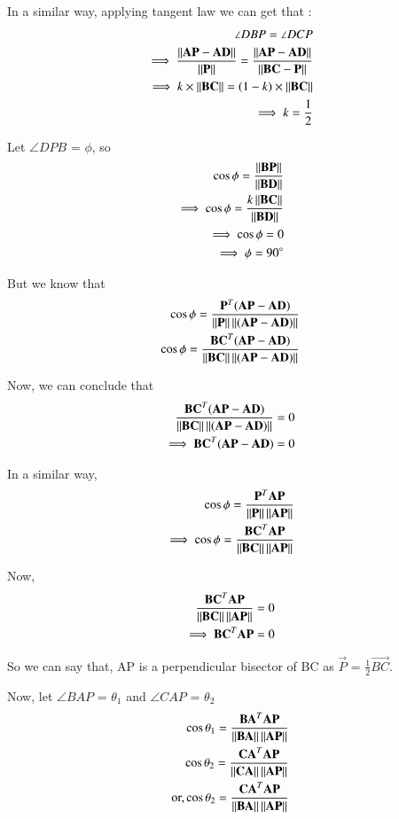 \documentclass[journal,12pt,twocolumn]{IEEEtran}
\begin{document}
In a similar way, applying tangent law we can get that :
\begin{align}
\angle DBP = \angle DCP\\
\implies \frac{\left\lVert\mathbf{AP}-\mathbf{AD}\right\rVert}{\left\lVert\mathbf{P}\right\rVert} = \frac{\left\lVert\mathbf{AP}-\mathbf{AD}\right\rVert}{\left\lVert\mathbf{BC}-\mathbf{P}\right\rVert}\\
\implies k \times \left\lVert\mathbf{BC}\right\rVert = (1-k) \times \left\lVert\mathbf{BC}\right\rVert\\
\implies k= \frac{1}{2}
\end{align}

Let $\angle DPB$ = $\phi$, so
\begin{align}
\cos\phi = \frac{\left\lVert\mathbf{BP}\right\rVert}{\left\lVert\mathbf{BD}\right\rVert}\\
\implies \cos\phi = \frac{k \left\lVert\mathbf{BC}\right\rVert}{\left\lVert\mathbf{BD}\right\rVert}\\
\implies \cos\phi = 0\\
\implies \phi = 90 \degree
\end{align}

But we know that 
\begin{align}
\cos\phi = \frac{\mathbf{P}^T (\mathbf{AP} - \mathbf{AD})}{\left\lVert\mathbf{P}\right\rVert\left\lVert(\mathbf{AP} - \mathbf{AD})\right\rVert}\\
\cos\phi = \frac{\mathbf{BC}^T (\mathbf{AP} - \mathbf{AD})}{\left\lVert\mathbf{BC}\right\rVert\left\lVert(\mathbf{AP} - \mathbf{AD})\right\rVert}
\end{align}

Now, we can conclude that 
\begin{align}
\frac{\mathbf{BC}^T (\mathbf{AP} - \mathbf{AD})}{\left\lVert\mathbf{BC}\right\rVert\left\lVert(\mathbf{AP} - \mathbf{AD})\right\rVert} = 0\\
\implies \mathbf{BC}^T (\mathbf{AP} - \mathbf{AD}) = 0
\end{align}

In a similar way,
\begin{align}
\cos\phi = \frac{\mathbf{P}^T \mathbf{AP}}{\left\lVert\mathbf{P}\right\rVert\left\lVert\mathbf{AP}\right\rVert}\\
\implies \cos\phi = \frac{\mathbf{BC}^T \mathbf{AP}}{\left\lVert\mathbf{BC}\right\rVert\left\lVert\mathbf{AP}\right\rVert}\\
\end{align}

Now, 
\begin{align}
\frac{\mathbf{BC}^T \mathbf{AP}}{\left\lVert\mathbf{BC}\right\rVert\left\lVert\mathbf{AP}\right\rVert} = 0\\
\implies \mathbf{BC}^T \mathbf{AP} = 0
\end{align}

So we can say that, AP is a perpendicular bisector of BC as $\vec{P}$ = $\frac{1}{2} \vec{BC}$.

Now, let $\angle BAP$ = $\theta_1$ and $\angle CAP$ = $\theta_2$
\begin{align}
\cos\theta_1 = \frac{\mathbf{BA}^T \mathbf{AP}}{\left\lVert\mathbf{BA}\right\rVert\left\lVert\mathbf{AP}\right\rVert}\\
\cos\theta_2 = \frac{\mathbf{CA}^T \mathbf{AP}}{\left\lVert\mathbf{CA}\right\rVert\left\lVert\mathbf{AP}\right\rVert}\\
\text{or,}\cos\theta_2 = \frac{\mathbf{CA}^T \mathbf{AP}}{\left\lVert\mathbf{BA}\right\rVert\left\lVert\mathbf{AP}\right\rVert}\\
\end{align}
\end{document}

